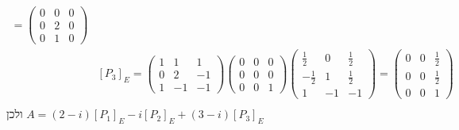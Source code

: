 \begin{align*}
	= \begin{pmatrix}
		0 & 0 & 0 \\
		0 & 2 & 0 \\
		0 & 1 & 0
	\end{pmatrix} \\
	& [P_3]_E = 
	\begin{pmatrix}
		1 & 1 & 1 \\
		0 & 2 & -1 \\
		1 & -1 & -1
	\end{pmatrix}
	\begin{pmatrix}
		0 & 0 & 0 \\ 
		0 & 0 & 0 \\ 
		0 & 0 & 1
	\end{pmatrix}
	\begin{pmatrix}
		\frac{1}{2} & 0 & \frac{1}{2} \\
		-\frac{1}{2} & 1 & \frac{1}{2} \\
		1 & -1 & -1
	\end{pmatrix}
	= \begin{pmatrix}
		0 & 0 & \frac{1}{2} \\
		0 & 0 & \frac{1}{2} \\
		0 & 0 & 1
	\end{pmatrix} \\
\end{align*}
ולכן $A = (2 - i) [P_1]_E - i [P_2]_E + (3 - i) [P_3]_E$


